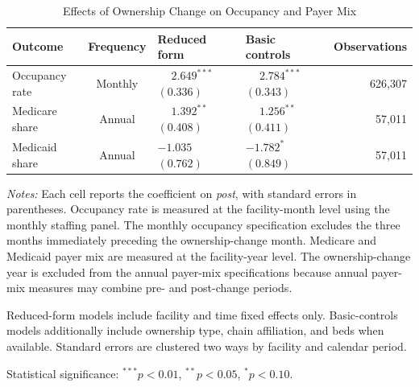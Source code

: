 \documentclass[12pt]{article}
\begin{document}
\begin{table}[!ht]
\centering
\begin{threeparttable}
\caption{Effects of Ownership Change on Occupancy and Payer Mix}
\label{tab:composition-checks}
\small
\setlength{\tabcolsep}{6pt}
\begin{tabularx}{\textwidth}{@{} l c Y Y r @{}}
\toprule
Outcome & Frequency & Reduced form & Basic controls & Observations \\
\midrule
Occupancy rate & Monthly &  &  & 626,307 \\
Medicare share & Annual &  &  & 57,011 \\
Medicaid share & Annual &  &  & 57,011 \\
\bottomrule
\end{tabularx}

\begin{tablenotes}[flushleft]
\footnotesize
\item \textit{Notes:} Each cell reports the coefficient on \textit{post}, with standard errors in parentheses. Occupancy rate is measured at the facility-month level using the monthly staffing panel. The monthly occupancy specification excludes the three months immediately preceding the ownership-change month. Medicare and Medicaid payer mix are measured at the facility-year level. The ownership-change year is excluded from the annual payer-mix specifications because annual payer-mix measures may combine pre- and post-change periods.
\item Reduced-form models include facility and time fixed effects only. Basic-controls models additionally include ownership type, chain affiliation, and beds when available. Standard errors are clustered two ways by facility and calendar period.
\item Statistical significance: $^{***}p<0.01$, $^{**}p<0.05$, $^{*}p<0.10$.
\end{tablenotes}
\end{threeparttable}
\end{table}
\end{document}
